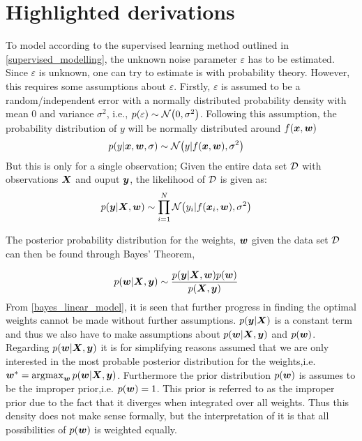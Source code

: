\newpage
\chapter{Highlighted derivations}\label{chap:derivations}
\thispagestyle{empty}

To model according to the supervised learning method outlined in \eqref{supervised_modelling}, the unknown noise parameter $\varepsilon$ has to be estimated. Since $\varepsilon$ is unknown, one can try to estimate is with probability theory. However, this requires some assumptions about $\varepsilon$. Firstly, $\varepsilon$ is assumed to be a random/independent error  with a normally distributed probability density with mean 0 and variance $\sigma^2$, i.e., $p(\varepsilon) \sim \mathcal{N}\qty(0,\sigma^2)$. Following this assumption, the probability distribution of $y$ will be normally distributed around $f\qty(\bm{x},\boldsymbol{w})$
\begin{align}
    p\qty(y|\bm{x},\boldsymbol{w},\sigma) &\sim \mathcal{N}\qty(y|f\qty(\bm{x},\boldsymbol{w}),\sigma^2)
\end{align}
But this is only for a single observation; Given the entire data set $\mathcal{D}$ with observations $\bm{X}$ and ouput $\bm{y}$, the likelihood of $\mathcal{D}$ is given as:
\begin{align}
    p\qty(\bm{y}|\bm{X},\boldsymbol{w}) &\sim \prod_{i=1}^{N} \mathcal{N}\qty(y_i|f\qty(\bm{x}_i,\boldsymbol{w}),\sigma^2)
\end{align}

The posterior probability distribution for the weights, $\boldsymbol{w}$ given the data set $\mathcal{D}$ can then be found through Bayes' Theorem,

\begin{align}\label{eq:bayes_linear_model}
    p\qty(\boldsymbol{w}|\bm{X},\bm{y}) &\sim \dfrac{p\qty(\bm{y}|\bm{X},\boldsymbol{w}) p\qty(\boldsymbol{w})}{p\qty(\bm{X},\bm{y})}
\end{align}
From \eqref{bayes_linear_model}, it is seen that further progress in finding the optimal weights cannot be made without further assumptions. $p\qty(\bm{y}|\bm{X})$ is a constant term and thus we also have to make assumptions about $p\qty(\boldsymbol{w}|\bm{X},\bm{y})$ and $p(\boldsymbol{w})$. Regarding $p\qty(\boldsymbol{w}|\bm{X},\bm{y})$ it is for simplifying reasons assumed that we are only interested in the most probable posterior distribution for the weights,i.e. $\boldsymbol{w}^* = \operatorname*{\arg\!\max}_{\boldsymbol{w}} p\qty(\boldsymbol{w}|\bm{X},\bm{y})$. Furthermore the prior distribution $p\qty(\boldsymbol{w})$ is assumes to be the improper prior,i.e. $p\qty(\boldsymbol{w})=1$. This prior is referred to as the improper prior due to the fact that it diverges when integrated over all weights. Thus this density does not make sense formally, but the interpretation of it is that all possibilities of $p\qty(\boldsymbol{w})$ is weighted equally.


